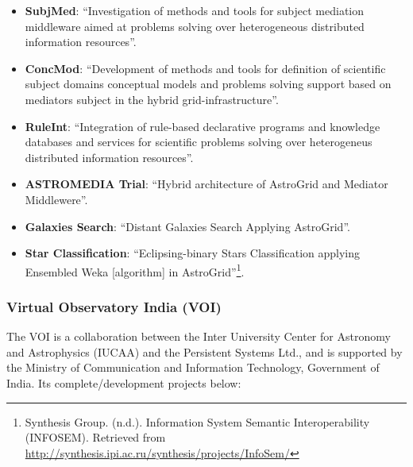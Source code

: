 \begin{itemize}
\item \textbf{SubjMed}:
``Investigation of methods and tools for subject mediation middleware aimed at
problems solving over heterogeneous distributed information resources''.

\item \textbf{ConcMod}:
``Development of methods and tools for definition of scientific subject domains
conceptual models and problems solving support based on mediators subject in the
hybrid grid-infrastructure''.

\item \textbf{RuleInt}:
``Integration of rule-based declarative programs and knowledge databases and
services for scientific problems solving over heterogeneus distributed
information resources''.

\item \textbf{ASTROMEDIA Trial}:
``Hybrid architecture of AstroGrid and Mediator Middlewere''.

\item \textbf{Galaxies Search}:
``Distant Galaxies Search Applying AstroGrid''.

\item \textbf{Star Classification}:
``Eclipsing-binary Stars Classification applying Ensembled Weka [algorithm] in
AstroGrid''\footnote{Synthesis Group. (n.d.). Information System Semantic
Interoperability (INFOSEM). Retrieved from
\url{http://synthesis.ipi.ac.ru/synthesis/projects/InfoSem/}}.
\end{itemize}

\subsubsection{Virtual Observatory India (VOI)}
The VOI \cite{website:voi-home} is a collaboration between the Inter University
Center for Astronomy and Astrophysics (IUCAA) and the Persistent Systems Ltd.,
and is supported by the Ministry of Communication and Information Technology,
Government of India. Its complete/development projects below:

